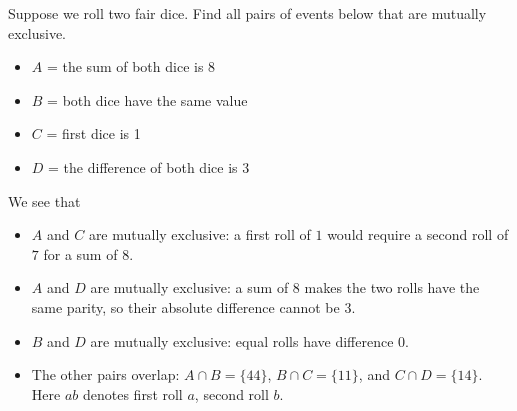  
\begin{frame}[t] 
\begin{ex} 
Suppose we roll two fair dice. Find all pairs of events below that are mutually exclusive.
\begin{itemize}
\item $A$ = the sum of both dice is 8
\item $B$ = both dice have the same value
\item $C$ = first dice is 1
\item $D$ = the difference of both dice is 3
\end{itemize}
\end{ex} 
\end{frame}

\begin{frame}
\begin{sol}
We see that
\begin{itemize}
\item $A$ and $C$ are mutually exclusive: a first roll of $1$ would require a second roll of $7$ for a sum of $8$.
\item $A$ and $D$ are mutually exclusive: a sum of $8$ makes the two rolls have the same parity, so their absolute difference cannot be $3$.
\item $B$ and $D$ are mutually exclusive: equal rolls have difference $0$.
\item The other pairs overlap: $A\cap B=\{44\}$, $B\cap C=\{11\}$, and $C\cap D=\{14\}$. Here $ab$ denotes first roll $a$, second roll $b$.
\end{itemize}

\end{sol}
\end{frame}

